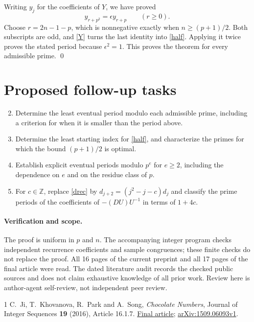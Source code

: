 \documentclass[11pt]{article}
\begin{document}
Writing $y_j$ for the coefficients of $Y$, we have proved
\[
y_{r+p^2}=\epsilon y_{r+p}\qquad(r\ge0).
\]
Choose $r=2n-1-p$, which is nonnegative exactly when $n\ge(p+1)/2$.
Both subscripts are odd, and \eqref{Y} turns the last identity into
\eqref{half}. Applying it twice proves the stated period because
$\epsilon^2=1$. This proves the theorem for every admissible prime.
\qed

\section*{Proposed follow-up tasks}
\begin{enumerate}
\setcounter{enumi}{1}
\item Determine the least eventual period modulo each admissible prime,
including a criterion for when it is smaller than the period above.
\item Determine the least starting index for \eqref{half}, and characterize
the primes for which the bound $(p+1)/2$ is optimal.
\item Establish explicit eventual periods modulo $p^e$ for $e\ge2$,
including the dependence on $e$ and on the residue class of $p$.
\item For $c\in\mathbb Z$, replace \eqref{drec} by
$d_{j+2}=(j^2-j-c)d_j$ and classify the prime periods of the
coefficients of $-(DU)U^{-1}$ in terms of $1+4c$.
\end{enumerate}

\paragraph{Verification and scope.}
The proof is uniform in $p$ and $n$. The accompanying integer program
checks independent recurrence coefficients and sample congruences;
these finite checks do not replace the proof. All 16 pages of the
current preprint and all 17 pages of the final article were read.
The dated literature audit records the checked public sources and
does not claim exhaustive knowledge of all prior work. Review here
is author-agent self-review, not independent peer review.

\begin{thebibliography}{1}
C.~Ji, T.~Khovanova, R.~Park and A.~Song,
\emph{Chocolate Numbers}, Journal of Integer Sequences \textbf{19}
(2016), Article 16.1.7.
\href{https://cs.uwaterloo.ca/journals/JIS/VOL19/Khovanova/khova9.pdf}{Final article};
\href{https://arxiv.org/abs/1509.06093}{arXiv:1509.06093v1}.
\end{thebibliography}
\end{document}
